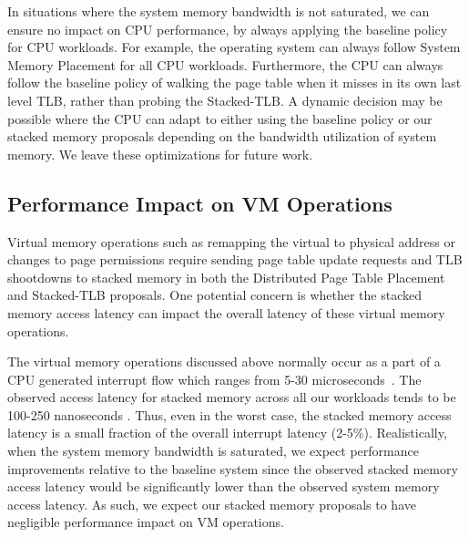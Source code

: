 In situations where the system memory bandwidth is not saturated, we
can ensure no impact on CPU performance, by always applying the
baseline policy for CPU workloads. For example, the operating system
can always follow System Memory Placement for all CPU workloads.
Furthermore, the CPU can always follow the baseline policy of walking
the page table when it misses in its own last level TLB, rather than
probing the Stacked-TLB. A dynamic decision may be possible where the
CPU can adapt to either using the baseline policy or our stacked
memory proposals depending on the bandwidth utilization of system
memory. We leave these optimizations for future work.

\subsection{Performance Impact on VM Operations}

\noindent Virtual memory operations such as remapping the virtual to
physical address or changes to page permissions require sending page
table update requests and TLB shootdowns to stacked memory in both the
Distributed Page Table Placement and Stacked-TLB proposals. One
potential concern is whether the stacked memory access latency can
impact the overall latency of these virtual memory operations. 

The virtual memory operations discussed above normally occur as a part
of a CPU generated interrupt flow which ranges from 5-30
microseconds~\cite{zhengpagedgpu}. The observed access latency for
stacked memory across all our workloads tends to be 100-250
nanoseconds . Thus, even in the worst case, the stacked memory access
latency is a small fraction of the overall interrupt latency (2-5\%).
Realistically, when the system memory bandwidth is saturated, we
expect performance improvements relative to the baseline system since
the observed stacked memory access latency would be significantly
lower than the observed system memory access latency. As such, we
expect our stacked memory proposals to have negligible performance
impact on VM operations.


% 

